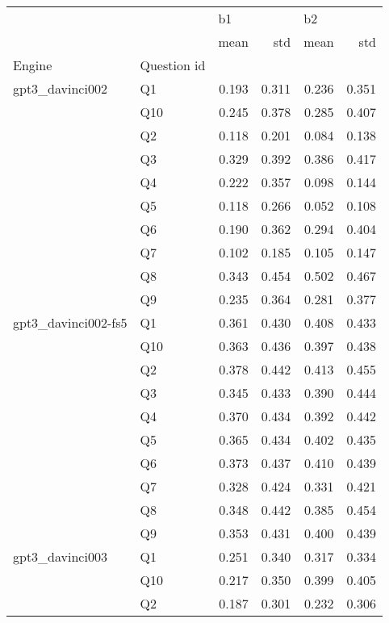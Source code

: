 \begin{tabular}{llrrrr}
\toprule
                &   & \multicolumn{2}{l}{b1} & \multicolumn{2}{l}{b2} \\
                &   &  mean &   std &  mean &   std \\
Engine & Question id &       &       &       &       \\
\midrule
gpt3\_davinci002 & Q1 & 0.193 & 0.311 & 0.236 & 0.351 \\
                & Q10 & 0.245 & 0.378 & 0.285 & 0.407 \\
                & Q2 & 0.118 & 0.201 & 0.084 & 0.138 \\
                & Q3 & 0.329 & 0.392 & 0.386 & 0.417 \\
                & Q4 & 0.222 & 0.357 & 0.098 & 0.144 \\
                & Q5 & 0.118 & 0.266 & 0.052 & 0.108 \\
                & Q6 & 0.190 & 0.362 & 0.294 & 0.404 \\
                & Q7 & 0.102 & 0.185 & 0.105 & 0.147 \\
                & Q8 & 0.343 & 0.454 & 0.502 & 0.467 \\
                & Q9 & 0.235 & 0.364 & 0.281 & 0.377 \\
gpt3\_davinci002-fs5 & Q1 & 0.361 & 0.430 & 0.408 & 0.433 \\
                & Q10 & 0.363 & 0.436 & 0.397 & 0.438 \\
                & Q2 & 0.378 & 0.442 & 0.413 & 0.455 \\
                & Q3 & 0.345 & 0.433 & 0.390 & 0.444 \\
                & Q4 & 0.370 & 0.434 & 0.392 & 0.442 \\
                & Q5 & 0.365 & 0.434 & 0.402 & 0.435 \\
                & Q6 & 0.373 & 0.437 & 0.410 & 0.439 \\
                & Q7 & 0.328 & 0.424 & 0.331 & 0.421 \\
                & Q8 & 0.348 & 0.442 & 0.385 & 0.454 \\
                & Q9 & 0.353 & 0.431 & 0.400 & 0.439 \\
gpt3\_davinci003 & Q1 & 0.251 & 0.340 & 0.317 & 0.334 \\
                & Q10 & 0.217 & 0.350 & 0.399 & 0.405 \\
                & Q2 & 0.187 & 0.301 & 0.232 & 0.306 \\

\end{tabular}
